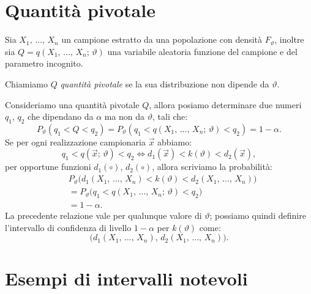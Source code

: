     \section{Quantità pivotale}
        \begin{defn}
            Sia $X_1,\, \ldots,\, X_{n}$ un campione estratto da una popolazione con densità $F_\vartheta$, 
            inoltre sia $Q = q(X_1,\, \ldots,\, X_{n};\, \vartheta)$ una variabile aleatoria funzione del 
            campione e del parametro incognito.

            Chiamiamo $Q$ \emph{quantità pivotale} se la sua distribuzione non dipende da $\vartheta$.
        \end{defn}
        \begin{obsv}
            Consideriamo una quantità pivotale $Q$, allora posiamo determinare due numeri $q_1,\, q_2$ che 
            dipendano da $\alpha$ ma non da $\vartheta$, tali che: \[
                P_\vartheta(q_1 < Q < q_2) = P_\vartheta(q_1 < q(X_1,\, \ldots,\, X_{n};\, \vartheta) < q_2) 
                = 1-\alpha
            .\] Se per ogni realizzazione campionaria $\vec{x}$ abbiamo: \[
            q_1 < q(\vec{x};\, \vartheta) < q_2 \iff d_1(\vec{x}) < k(\vartheta) < d_2(\vec{x})
        ,\] per opportune funzioni $d_1(\circ),\, d_2(\circ)$, allora scriviamo la probabilità:
        \begin{align*}
            &P_\vartheta\big(d_1(X_1,\, \ldots,\, X_{n}) < k(\vartheta) < d_2(X_1,\, \ldots,\, X_{n})\big) \\
            &= P_\vartheta\big(q_1 < q(X_1,\, \ldots,\, X_{n};\, \vartheta) < q_2\big) \\
            &= 1-\alpha
        .\end{align*}
        La precedente relazione vale per qualunque valore di $\vartheta$; possiamo quindi definire l'intervallo 
        di confidenza di livello $1-\alpha$ per $k(\vartheta)$ come: \[
            \big(d_1(X_1,\, \ldots,\, X_{n}),\, d_2(X_1,\, \ldots,\, X_{n})\big)
        .\]
        \end{obsv}
        \pagebreak %
    \section{Esempi di intervalli notevoli}
